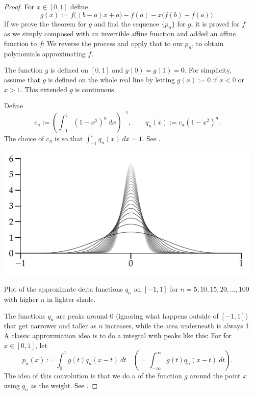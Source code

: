 \begin{proof}
For $x \in [0,1]$ define
\begin{equation*}
g(x) := f\bigl((b-a)x+a\bigr)-f(a) - x\bigl(f(b)-f(a)\bigr) .
\end{equation*}
If we prove the theorem for $g$ and find the sequence $\{ p_n \}$ for $g$,
it is proved for $f$ as we simply
composed with an invertible affine function and added an affine
function to $f$:  We reverse the process and apply that to our
$p_n$, to obtain polynomials approximating $f$.

The function $g$ is defined on $[0,1]$ and $g(0)=g(1)=0$.
For simplicity, assume that
$g$ is defined on the whole real line by letting
$g(x) := 0$ if $x < 0$ or $x > 1$.  This extended $g$ is continuous.

Define
\begin{equation*}
c_n := {\left( \int_{-1}^1 {(1-x^2)}^n~dx \right)}^{-1} ,
\qquad
q_n(x) := c_n (1-x^2)^n .
\end{equation*}
The choice of $c_n$ is
so that $\int_{-1}^1 q_n(x)~dx = 1$.
See .

\begin{myfigureht}
\includegraphics{figures/weierqn}
\caption{Plot of the approximate delta functions $q_n$ on $[-1,1]$ for
$n=5,10,15,20,\ldots,100$ with higher $n$ in lighter shade.\label{fig:weierqn}}
\end{myfigureht}

The functions $q_n$ are peaks around 0 (ignoring what happens outside
of $[-1,1]$) that get narrower and taller as $n$ increases,
while the area underneath is always 1.
A classic approximation idea
is to do a \emph{} integral with peaks like this:
For
for $x \in [0,1]$, let
\begin{equation*}
p_n(x) := \int_{0}^1 g(t)q_n(x-t) ~dt \quad \left( = \int_{-\infty}^\infty
g(t)q_n(x-t) ~dt \right) .
\end{equation*}
The idea of this convolution is that we do a  of the
function $g$ around the point $x$ using $q_n$ as the weight.
See .


\end{proof}
